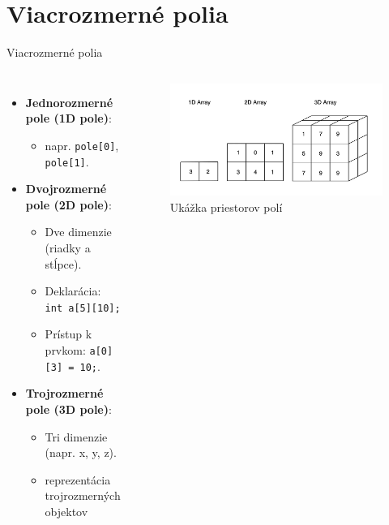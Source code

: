 \documentclass[xcolor=dvipsnames]{beamer}
\begin{document}
\section{Viacrozmerné polia}
\begin{frame}{Viacrozmerné polia}
\begin{columns}
    \begin{itemize}
    \item \textbf{Jednorozmerné pole (1D pole)}:
        \begin{itemize}
            \item napr. \texttt{pole[0]}, \texttt{pole[1]}.
        \end{itemize}
    \item \textbf{Dvojrozmerné pole (2D pole)}:
        \begin{itemize}
            \item Dve dimenzie (riadky a stĺpce).
            \item Deklarácia: \texttt{int a[5][10];}
            \item Prístup k prvkom: \texttt{a[0][3] = 10;}.
        \end{itemize}
    \item \textbf{Trojrozmerné pole (3D pole)}:
        \begin{itemize}
            \item Tri dimenzie (napr. x, y, z).
            \item reprezentácia trojrozmerných objektov
        \end{itemize}
\end{itemize}
\begin{figure}
    \centering
    \includegraphics[width=1\linewidth]{latexprez2.jpg}
    \caption{Ukážka priestorov polí \footnotemark}
    \label{fig:1_2_3D_arr_example}
\end{figure}
\end{columns}
\end{frame}
\end{document}
